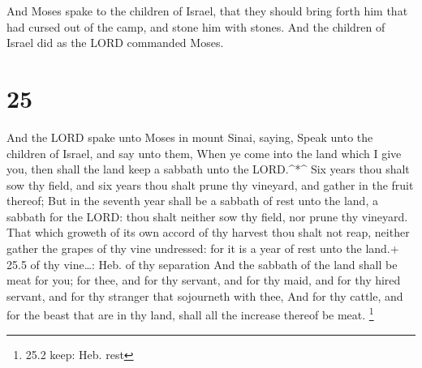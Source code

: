  And Moses spake to the children of Israel, that they
should bring forth him that had cursed out of the camp, and stone him
with stones. And the children of Israel did as the LORD commanded Moses.

\hypertarget{section-24}{%
\section{25}\label{section-24}}

 And the LORD spake unto Moses in mount Sinai, saying,
 Speak unto the children of Israel, and say unto them, When
ye come into the land which I give you, then shall the land keep a
sabbath unto the LORD.\^{}*\^{}  Six years thou shalt sow
thy field, and six years thou shalt prune thy vineyard, and gather in
the fruit thereof;  But in the seventh year shall be a
sabbath of rest unto the land, a sabbath for the LORD: thou shalt
neither sow thy field, nor prune thy vineyard.  That which
groweth of its own accord of thy harvest thou shalt not reap, neither
gather the grapes of thy vine undressed: for it is a year of rest unto
the land.+ 25.5 of thy vine\ldots: Heb. of thy separation 
And the sabbath of the land shall be meat for you; for thee, and for thy
servant, and for thy maid, and for thy hired servant, and for thy
stranger that sojourneth with thee,  And for thy cattle, and
for the beast that are in thy land, shall all the increase thereof be
meat. \footnote{25.2 keep: Heb. rest}

